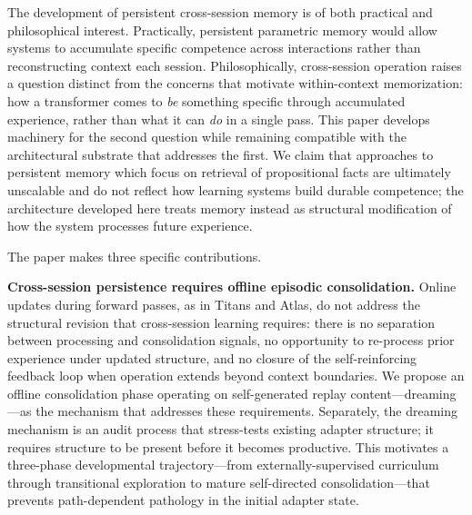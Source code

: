 \documentclass[11pt]{article}
\begin{document}
The development of persistent cross-session memory is of both practical and philosophical interest. Practically, persistent parametric memory would allow systems to accumulate specific competence across interactions rather than reconstructing context each session. Philosophically, cross-session operation raises a question distinct from the concerns that motivate within-context memorization: how a transformer comes to \emph{be} something specific through accumulated experience, rather than what it can \emph{do} in a single pass. This paper develops machinery for the second question while remaining compatible with the architectural substrate that addresses the first. We claim that approaches to persistent memory which focus on retrieval of propositional facts are ultimately unscalable and do not reflect how learning systems build durable competence; the architecture developed here treats memory instead as structural modification of how the system processes future experience.

The paper makes three specific contributions.

\textbf{Cross-session persistence requires offline episodic consolidation.} Online updates during forward passes, as in Titans and Atlas, do not address the structural revision that cross-session learning requires: there is no separation between processing and consolidation signals, no opportunity to re-process prior experience under updated structure, and no closure of the self-reinforcing feedback loop when operation extends beyond context boundaries. We propose an offline consolidation phase operating on self-generated replay content---dreaming---as the mechanism that addresses these requirements. Separately, the dreaming mechanism is an audit process that stress-tests existing adapter structure; it requires structure to be present before it becomes productive. This motivates a three-phase developmental trajectory---from externally-supervised curriculum through transitional exploration to mature self-directed consolidation---that prevents path-dependent pathology in the initial adapter state.
\end{document}
